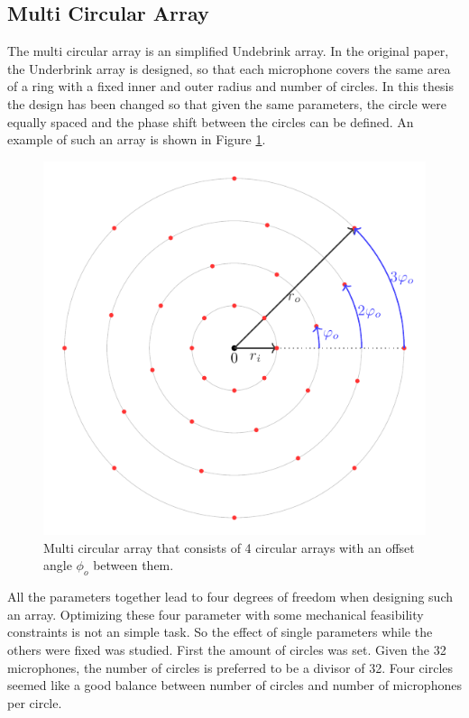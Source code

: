 \subsection{Multi Circular Array}
The multi circular array is an simplified Undebrink array.
In the original paper, the Underbrink array is designed, so that each
microphone covers the same area of a ring with a fixed inner and outer radius and number of circles.
In this thesis the design has been changed so that given the same parameters,
the circle were equally spaced and the phase shift between the circles can be defined.
An example of such an array is shown in Figure \ref*{aev:fig:FancyArr}.
\begin{figure}[h]
	\centering
	\includegraphics[]{images/5_array_evaluation/fancy_arr.pdf}
	\caption{Multi circular array that consists of 4 circular arrays
	with an offset angle $\phi_o$ between them.}
	\label{aev:fig:FancyArr}
\end{figure}

All the parameters together lead to four degrees of freedom when designing such an array.
Optimizing these four parameter with some mechanical feasibility constraints is not an simple task.
So the effect of single parameters while the others were fixed was studied.
First the amount of circles was set.
Given the 32 microphones, the number of circles is preferred to be a divisor of 32.
Four circles seemed like a good balance between number of circles and number of microphones
per circle.

